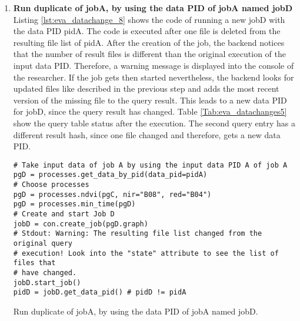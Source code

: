 \documentclass[draft,final]{vutinfth} %
\newenvironment{code}{\captionsetup{type=listing}}{}
\begin{document}
\begin{enumerate}
	\begin{code}
		\begin{verbatim} 
[{'timestamp': '2019-03-31 17:44:43', 
'path': '/eodc/products/copernicus.eu/s2a_prd_msil1c/2017/05/24/
S2A_MSIL1C_20170524T101031_N0205_R022_T32TQR_20170524T101353_new.zip'}]
		\end{verbatim}
		\caption{List of files that replaced original files of the query result.}
		\label{lst:eva_datachange_state}
	\end{code}
	
	\item \textbf{Run duplicate of jobA, by using the data PID of jobA named jobD}\\
	Listing \ref{lst:eva_datachange_8} shows the code of running a new jobD with the data PID pidA. The code is executed after one file is deleted from the resulting file list of pidA. After the creation of the job, the backend notices that the number of result files is different than the original execution of the input data PID. Therefore, a warning message is displayed into the console of the researcher. If the job gets then started nevertheless, the backend looks for updated files like described in the previous step and adds the most recent version of the missing file to the query result. This leads to a new data PID for jobD, since the query result has changed. Table \ref{Tab:eva_datachanges5} show the query table status after the execution. The second query entry has a different result hash, since one file changed and therefore, gets a new data PID.  
	\begin{code}
		\begin{verbatim}
# Take input data of job A by using the input data PID A of job A
pgD = processes.get_data_by_pid(data_pid=pidA)
# Choose processes
pgD = processes.ndvi(pgC, nir="B08", red="B04")
pgD = processes.min_time(pgD)
# Create and start Job D
jobD = con.create_job(pgD.graph)
# Stdout: Warning: The resulting file list changed from the original query
# execution! Look into the "state" attribute to see the list of files that
# have changed. 
jobD.start_job()
pidD = jobD.get_data_pid() # pidD != pidA
		\end{verbatim}
		\caption{Run duplicate of jobA, by using the data PID of jobA named jobD.}
		\label{lst:eva_datachange_8}
	\end{code}
	

\end{enumerate}
\end{document}
